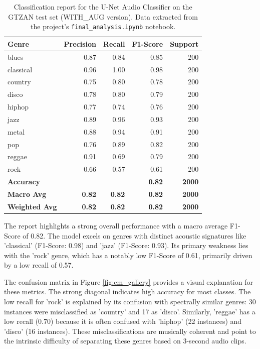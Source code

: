 \documentclass[11pt,a4paper]{article}
\begin{document}
\begin{table}[H]
\centering
\caption{Classification report for the U-Net Audio Classifier on the GTZAN test set (WITH\_AUG version). Data extracted from the project's \texttt{final\_analysis.ipynb} notebook.}
\label{tab:classification_report}
\begin{tabular}{lrrrr}
\toprule
\textbf{Genre} & \textbf{Precision} & \textbf{Recall} & \textbf{F1-Score} & \textbf{Support} \\
\midrule
blues & 0.87 & 0.84 & 0.85 & 200 \\
classical & 0.96 & 1.00 & 0.98 & 200 \\
country & 0.75 & 0.80 & 0.78 & 200 \\
disco & 0.78 & 0.80 & 0.79 & 200 \\
hiphop & 0.77 & 0.74 & 0.76 & 200 \\
jazz & 0.89 & 0.96 & 0.93 & 200 \\
metal & 0.88 & 0.94 & 0.91 & 200 \\
pop & 0.76 & 0.89 & 0.82 & 200 \\
reggae & 0.91 & 0.69 & 0.79 & 200 \\
rock & 0.66 & 0.57 & 0.61 & 200 \\
\midrule
\textbf{Accuracy} & & & \textbf{0.82} & \textbf{2000} \\
\textbf{Macro Avg} & \textbf{0.82} & \textbf{0.82} & \textbf{0.82} & \textbf{2000} \\
\textbf{Weighted Avg} & \textbf{0.82} & \textbf{0.82} & \textbf{0.82} & \textbf{2000} \\
\bottomrule
\end{tabular}
\end{table}

The report highlights a strong overall performance with a macro average F1-Score of 0.82. The model excels on genres with distinct acoustic signatures like 'classical' (F1-Score: 0.98) and 'jazz' (F1-Score: 0.93). Its primary weakness lies with the 'rock' genre, which has a notably low F1-Score of 0.61, primarily driven by a low recall of 0.57.

The confusion matrix in Figure \ref{fig:cm_gallery} provides a visual explanation for these metrics. The strong diagonal indicates high accuracy for most classes. The low recall for 'rock' is explained by its confusion with spectrally similar genres: 30 instances were misclassified as 'country' and 17 as 'disco'. Similarly, 'reggae' has a low recall (0.70) because it is often confused with 'hiphop' (22 instances) and 'disco' (16 instances). These misclassifications are musically coherent and point to the intrinsic difficulty of separating these genres based on 3-second audio clips.
\end{document}
